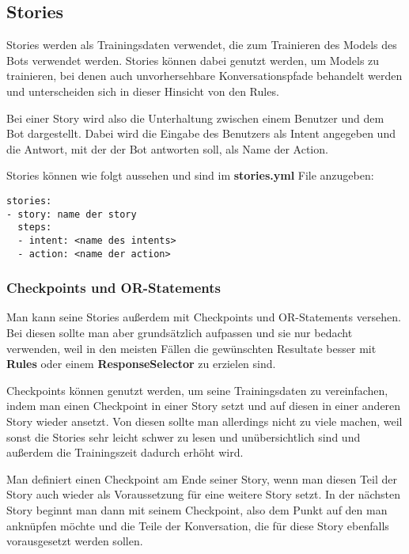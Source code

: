 \subsection{Stories}

Stories werden als Trainingsdaten verwendet, die zum Trainieren des Models des Bots verwendet werden.
Stories können dabei genutzt werden, um Models zu trainieren, bei denen auch unvorhersehbare Konversationspfade behandelt werden und unterscheiden sich in dieser Hinsicht von den Rules.
\cite{stories}

Bei einer Story wird also die Unterhaltung zwischen einem Benutzer und dem Bot dargestellt.
Dabei wird die Eingabe des Benutzers als Intent angegeben und die Antwort, mit der der Bot antworten soll, als Name der Action.
\cite{stories}

Stories können wie folgt aussehen und sind im \textbf{stories.yml} File anzugeben:

\begin{lstlisting}[label={lst: Stories Example}]
stories:
- story: name der story
  steps:
  - intent: <name des intents>
  - action: <name der action>
\end{lstlisting}

\subsubsection{Checkpoints und OR-Statements}

Man kann seine Stories außerdem mit Checkpoints und OR-Statements versehen.
Bei diesen sollte man aber grundsätzlich aufpassen und sie nur bedacht verwenden, weil in den meisten Fällen die gewünschten Resultate besser mit \textbf{Rules} oder einem \textbf{ResponseSelector} zu erzielen sind.
\cite{checkpointsor}

Checkpoints können genutzt werden, um seine Trainingsdaten zu vereinfachen, indem man einen Checkpoint in einer Story setzt und auf diesen in einer anderen Story wieder ansetzt.
Von diesen sollte man allerdings nicht zu viele machen, weil sonst die Stories sehr leicht schwer zu lesen und unübersichtlich sind und außerdem die Trainingszeit dadurch erhöht wird.
\cite{checkpoints}

Man definiert einen Checkpoint am Ende seiner Story, wenn man diesen Teil der Story auch wieder als Voraussetzung für eine weitere Story setzt.
In der nächsten Story beginnt man dann mit seinem Checkpoint, also dem Punkt auf den man anknüpfen möchte und die Teile der Konversation, die für diese Story ebenfalls vorausgesetzt werden sollen.

